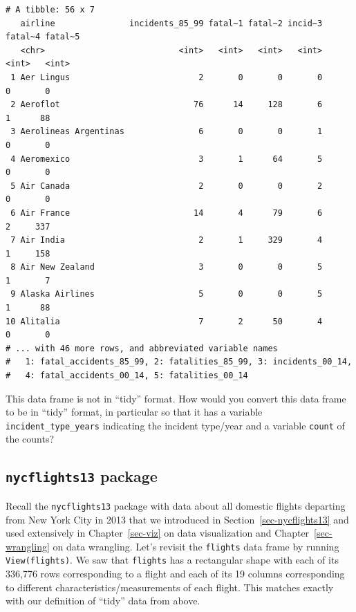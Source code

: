 \documentclass[
  letterpaper,
  DIV=11,
  numbers=noendperiod]{scrreprt}
\theoremstyle{definition}
\theoremstyle{remark}
\begin{document}
\begin{tcolorbox}
\begin{verbatim}
# A tibble: 56 x 7
   airline               incidents_85_99 fatal~1 fatal~2 incid~3 fatal~4 fatal~5
   <chr>                           <int>   <int>   <int>   <int>   <int>   <int>
 1 Aer Lingus                          2       0       0       0       0       0
 2 Aeroflot                           76      14     128       6       1      88
 3 Aerolineas Argentinas               6       0       0       1       0       0
 4 Aeromexico                          3       1      64       5       0       0
 5 Air Canada                          2       0       0       2       0       0
 6 Air France                         14       4      79       6       2     337
 7 Air India                           2       1     329       4       1     158
 8 Air New Zealand                     3       0       0       5       1       7
 9 Alaska Airlines                     5       0       0       5       1      88
10 Alitalia                            7       2      50       4       0       0
# ... with 46 more rows, and abbreviated variable names
#   1: fatal_accidents_85_99, 2: fatalities_85_99, 3: incidents_00_14,
#   4: fatal_accidents_00_14, 5: fatalities_00_14
\end{verbatim}

This data frame is not in ``tidy'' format. How would you convert this
data frame to be in ``tidy'' format, in particular so that it has a
variable \texttt{incident\_type\_years} indicating the incident
type/year and a variable \texttt{count} of the counts?
\end{tcolorbox}

\hypertarget{nycflights13-package-1}{%
\subsection{\texorpdfstring{\texttt{nycflights13}
package}{nycflights13 package}}\label{nycflights13-package-1}}

Recall the \texttt{nycflights13} package with data about all domestic
flights departing from New York City in 2013 that we introduced in
Section~\ref{sec-nycflights13} and used extensively in
Chapter~\ref{sec-viz} on data visualization and
Chapter~\ref{sec-wrangling} on data wrangling. Let's revisit the
\texttt{flights} data frame by running \texttt{View(flights)}. We saw
that \texttt{flights} has a rectangular shape with each of its 336,776
rows corresponding to a flight and each of its 19 columns corresponding
to different characteristics/measurements of each flight. This matches
exactly with our definition of ``tidy'' data from above.
\end{document}
